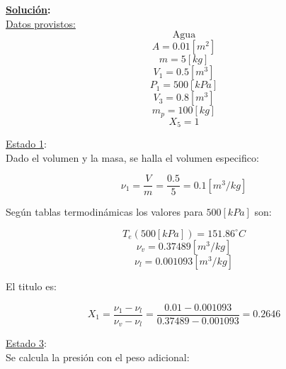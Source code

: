 \documentclass[letter,11pt]{article}
\begin{document}
\begin{enumerate}
\textbf{\underline{Solución}:} \\

\underline{Datos provistos:} \\

\begin{equation*}
    \text{Agua}
\end{equation*}
\begin{equation*}
    A=0.01[m^2]
\end{equation*}
\begin{equation*}
    m=5[kg]
\end{equation*}
\begin{equation*}
    V_1=0.5[m^3]
\end{equation*}
\begin{equation*}
    P_1=500[kPa]
\end{equation*}
\begin{equation*}
    V_3=0.8[m^3]
\end{equation*}
\begin{equation*}
    m_p=100[kg]
\end{equation*}
\begin{equation*}
    X_5=1
\end{equation*}

\underline{Estado 1}:\\
Dado el volumen y la masa, se halla el volumen especifico:

\begin{equation*}
    \nu_1=\frac{V}{m}=\frac{0.5}{5}=0.1[m^3/kg]
\end{equation*}

Según tablas termodinámicas los valores para $500[kPa]$ son:

\begin{equation*}
    T_{e}(500[kPa])=151.86^\circ C
\end{equation*}
\begin{equation*}
    \nu_v=0.37489[m^3/kg]
\end{equation*}
\begin{equation*}
    \nu_l=0.001093[m^3/kg]
\end{equation*}

El titulo es:

\begin{equation*}
    X_1=\frac{\nu_1-\nu_l}{\nu_v-\nu_l}
    =\frac{0.01-0.001093}{0.37489-0.001093}
    =0.2646
\end{equation*}

\underline{Estado 3}:\\
Se calcula la presión con el peso adicional:


\end{enumerate}
\end{document}
